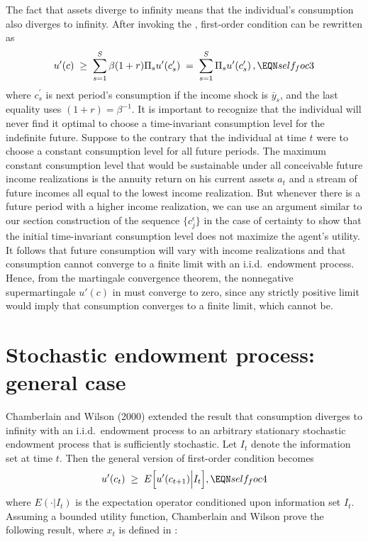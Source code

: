 The fact that assets diverge to infinity means that the individual's
consumption also diverges to infinity. After invoking the
, first-order condition 
can be rewritten as
$$
u'(c) \;\geq\; \sum_{s=1}^S \beta (1+r) \Pi_s u'(c^\prime_s)
      \;=\; \sum_{s=1}^S  \Pi_s u'(c^\prime_s)\,,           \EQN self_foc3
$$
where $c^\prime_s$ is next period's consumption if the income
shock is $\overline y_s$, and the last equality uses $(1+r)=\beta^{-1}$.
It is important to recognize that the individual will never find
it optimal to choose a time-invariant consumption level for the
indefinite future. Suppose to the contrary that the individual
at time $t$ were to choose a constant consumption level for all
future periods. The maximum constant consumption level that would
be sustainable under all conceivable future income realizations
is the annuity return on  his current assets $a_t$ and a stream of
future incomes all equal to the lowest income realization. But
whenever there is a future period with a higher income realization,
we can use an argument similar to our section  construction of the sequence
$\{c^\epsilon_j\}$ in the case of certainty to show that
the initial time-invariant consumption level does not maximize
the agent's utility. It follows that future consumption
will vary with income realizations and  that consumption cannot
converge to a finite limit with an i.i.d.\ endowment process.
Hence, from  the martingale convergence
theorem, the nonnegative supermartingale $u'(c)$ in 
must converge to zero, since any strictly positive limit would
imply that consumption
converges to a finite limit, which cannot be.




\section{Stochastic endowment process: general case}

Chamberlain and Wilson (2000) extended the result that consumption diverges to infinity with an i.i.d.\
endowment process 
 to an arbitrary stationary
stochastic endowment
process that is sufficiently stochastic. Let $I_t$ denote the information
set at time $t$. Then the general version of first-order condition
\Ep{self_foc3} becomes
\offparens
$$
u'(c_t) \;\geq\; E\Bigl[u'(c_{t+1}) \Big| I_t\Bigr],           \EQN self_foc4
$$
\autoparens
where $E(\cdot|I_t)$ is the expectation operator conditioned upon
information set $I_t$. Assuming a bounded utility function,
Chamberlain and Wilson prove the following result, where $x_t$ is defined
in \Ep{self_x}:

